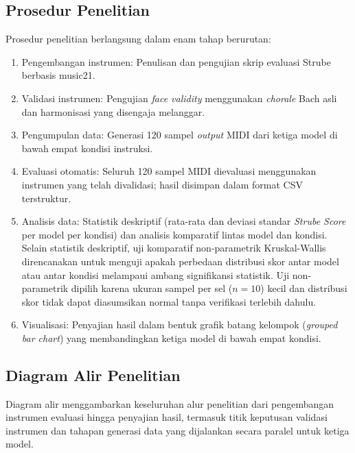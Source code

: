 \subsection{Prosedur Penelitian}

Prosedur penelitian berlangsung dalam enam tahap berurutan:

\begin{enumerate}
    \item Pengembangan instrumen: Penulisan dan pengujian skrip evaluasi Strube berbasis music21.
    \item Validasi instrumen: Pengujian \textit{face validity} menggunakan \textit{chorale} Bach asli dan harmonisasi yang disengaja melanggar.
    \item Pengumpulan data: Generasi 120 sampel \textit{output} MIDI dari ketiga model di bawah empat kondisi instruksi.
    \item Evaluasi otomatis: Seluruh 120 sampel MIDI dievaluasi menggunakan instrumen yang telah divalidasi; hasil disimpan dalam format CSV terstruktur.
    \item Analisis data: Statistik deskriptif (rata-rata dan deviasi standar \textit{Strube Score} per model per kondisi) dan analisis komparatif lintas model dan kondisi. Selain statistik deskriptif, uji komparatif non-parametrik Kruskal-Wallis direncanakan untuk menguji apakah perbedaan distribusi skor antar model atau antar kondisi melampaui ambang signifikansi statistik. Uji non-parametrik dipilih karena ukuran sampel per sel ($n=10$) kecil dan distribusi skor tidak dapat diasumsikan normal tanpa verifikasi terlebih dahulu.
    \item Visualisasi: Penyajian hasil dalam bentuk grafik batang kelompok (\textit{grouped bar chart}) yang membandingkan ketiga model di bawah empat kondisi.
\end{enumerate}

\subsection{Diagram Alir Penelitian}

Diagram alir menggambarkan keseluruhan alur penelitian dari pengembangan instrumen evaluasi hingga penyajian hasil, termasuk titik keputusan validasi instrumen dan tahapan generasi data yang dijalankan secara paralel untuk ketiga model.

